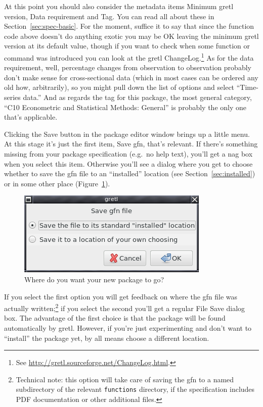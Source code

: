\documentclass[oneside]{book}
\begin{document}
At this point you should also consider the metadata items
\textsf{Minimum gretl version}, \textsf{Data requirement} and
\textsf{Tag}.  You can read all about these in
Section~\ref{sec:spec-basic}. For the moment, suffice it to say that
since the function code above doesn't do anything exotic you may be OK
leaving the minimum gretl version at its default value, though if you
want to check when some function or command was introduced you can
look at the gretl ChangeLog.\footnote{See
  \url{http://gretl.sourceforge.net/ChangeLog.html}.} As for the data
requirement, well, percentage changes from observation to observation
probably don't make sense for cross-sectional data (which in most
cases can be ordered any old how, arbitrarily), so you might pull down
the list of options and select ``Time-series data.'' And as regards
the tag for this package, the most general category, ``C10 Econometric
and Statistical Methods: General'' is probably the only one that's
applicable.

Clicking the \textsf{Save} button in the package editor window brings
up a little menu. At this stage it's just the first item, \textsf{Save
  gfn}, that's relevant. If there's something missing from your
package specification (e.g.\ no help text), you'll get a nag box when
you select this item. Otherwise you'll see a dialog where you get to
choose whether to save the \textsf{gfn} file to an ``installed''
location (see Section~\ref{sec:installed}) or in some other place
(Figure~\ref{fig:gfnsave}).

\begin{figure}[htbp]
  \centering
  \includegraphics[scale=0.45]{figures/gfnsave}
  \caption{Where do you want your new package to go?}
  \label{fig:gfnsave}
\end{figure}

If you select the first option you will get feedback on where the gfn
file was actually written;\footnote{Technical note: this option will
  take care of saving the \textsf{gfn} to a named subdirectory of the
  relevant \texttt{functions} directory, if the specification includes
  PDF documentation or other additional files.} if you select the
second you'll get a regular File Save dialog box. The advantage of the
first choice is that the package will be found automatically by gretl.
However, if you're just experimenting and don't want to ``install''
the package yet, by all means choose a different location.
\end{document}
